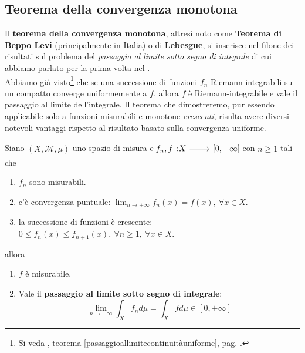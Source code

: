 \subsection{Teorema della convergenza monotona}
Il \textbf{teorema della convergenza monotona}, altresì noto come \textbf{Teorema di Beppo Levi} (principalmente in Italia) o di \textbf{Lebesgue}, si inserisce nel filone dei risultati sul problema del \textit{passaggio al limite sotto segno di integrale} di cui abbiamo parlato per la prima volta nel .\\
Abbiamo già visto\footnote{Si veda , teorema \ref{passaggioallimitecontinuitàuniforme}, pag. \pageref{passaggioallimitecontinuitàuniforme}.} che se una successione di funzioni $f_n$ Riemann-integrabili su un compatto converge uniformemente a $f$, allora $f$ è Riemann-integrabile e vale il passaggio al limite dell'integrale. Il teorema che dimostreremo, pur essendo applicabile solo a funzioni misurabili e monotone \textit{crescenti}, risulta avere diversi notevoli vantaggi rispetto al risultato basato sulla convergenza uniforme.
\begin{theorema}\label{thmconvergenzamonotona}
	Siano $\left(X,\mathcal{M},\mu\right)$ uno spazio di misura e $\funz{f_n,f}{X}{\left[0,+\infty\right]}$ con $n\geq 1$ tali che
	\begin{enumerate}
		\item $f_n$ sono misurabili.
		\item c'è convergenza puntuale: $\displaystyle\lim_{n\to+\infty}f_n(x)=f(x),\ \forall x\in X$.
		\item la successione di funzioni è crescente: $0\leq f_n(x)\leq f_{n+1}(x),\ \forall n\geq 1,\ \forall x\in X$.
	\end{enumerate}
allora
\begin{enumerate}
	\item $f$ è misurabile.
	\item Vale il \textbf{passaggio al limite sotto segno di integrale}:
	\begin{equation}
		\lim_{n\to+\infty}\int_Xf_nd\mu=\int_Xfd\mu\in\left[0,+\infty\right]
	\end{equation}
\end{enumerate}
\end{theorema}
